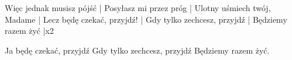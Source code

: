 \documentclass[../../../songbook.tex]{subfiles}
\begin{document}
\-\hspace{1cm} Więc jednak musisz pójść		\tab	| \newline
\-\hspace{1cm} Posyłasz mi przez próg		\tab	| \newline
\-\hspace{1cm} Ulotny uśmiech twój, Madame	\tab	| \newline
\-\hspace{1cm} Lecz będę czekać, przyjdź!	\tab	| \newline
\-\hspace{1cm} Gdy tylko zechcesz, przyjdź	\tab	| \newline
\-\hspace{1cm} Będziemy razem żyć			\tab	|x2 \newline

\-\hspace{1cm} Ja będę czekać, przyjdź	 \newline	
\-\hspace{1cm} Gdy tylko zechcesz, przyjdź	 \newline	
\-\hspace{1cm} Będziemy razem żyć.		 \newline
\end{document}

